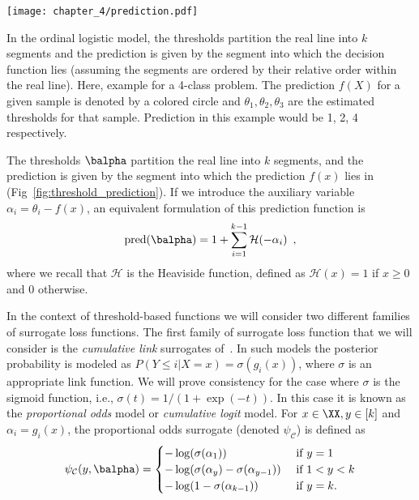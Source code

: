 \begin{marginfigure}
\texttt{[image: chapter\_4/prediction.pdf]}
\caption{In the ordinal logistic model, the thresholds partition the real line into $k$ segments and the prediction is given by the segment into which the decision function lies (assuming the segments are ordered by their relative order within the real line). Here, example for a 4-class problem. The prediction $f(X)$ for a given sample is denoted by a colored circle and $\theta_1, \theta_2, \theta_3$ are the estimated thresholds for that sample. Prediction in this example would be 1, 2, 4 respectively.}\label{fig:threshold_prediction}
\end{marginfigure}



The thresholds $\balpha$ partition the real line into $k$ segments, and the prediction is given by the segment into which the prediction $f(x)$ lies in (Fig~\ref{fig:threshold_prediction}). If we introduce the auxiliary variable $\alpha_i = \theta_i - f(x)$, an equivalent formulation of this prediction function is
\begin{equation}\label{eq:pred_threshold}
\text{pred}(\balpha) = 1 + \sum_{i=1}^{k-1} \mathcal{H}(-\alpha_i) \enspace,
\end{equation}
where we recall that $\mathcal{H}$ is the Heaviside function, defined as $\mathcal{H}(x) = 1$ if $x \geq 0$ and $0$ otherwise.





In the context of threshold-based functions we will consider two different families of surrogate loss functions. The first family of surrogate loss function that we will consider is the \emph{cumulative link} surrogates of~\citet{McCullagh1980}. In such models the posterior probability is modeled as $P(Y \leq i|X\!=\!x) = \sigma(g_i(x))$, where $\sigma$ is an appropriate link function. We will prove consistency for the case where $\sigma$ is the sigmoid function, i.e., $\sigma(t) = 1/(1 + \exp(-t))$. In this case it is known as the \emph{proportional odds} model or \emph{cumulative logit} model. For $x \in \XX, y \in [k]$ and $\alpha_i = g_i(x)$, the proportional odds surrogate (denoted $\psi_{\mathcal{C}}$) is defined as
\begin{equation}\label{eq:propodds}
\psi_{\mathcal{C}}(y, \balpha) = 
\begin{cases}
-\log(\sigma(\alpha_1)) &\text{ if } y = 1 \\
-\log(\sigma(\alpha_y) - \sigma(\alpha_{y-1})) &\text{ if } 1 < y < k \\
-\log(1 - \sigma(\alpha_{k-1})) &\text{ if } y = k.
\end{cases}
\end{equation}



